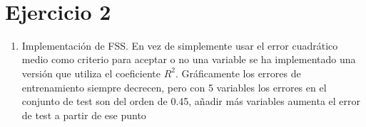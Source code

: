 \documentclass[11pt]{article}
\begin{document}
    \begin{center}
    \end{center}
    { \hspace*{\fill} \\}
    
    \section{Ejercicio 2}\label{ejercicio-2}

    \begin{enumerate}
\def\labelenumi{(\alph{enumi})}
\itemsep1pt\parskip0pt
\item
  Implementación de FSS. En vez de simplemente usar el error cuadrático
  medio como criterio para aceptar o no una variable se ha implementado
  una versión que utiliza el coeficiente \(R^2\). Gráficamente los
  errores de entrenamiento siempre decrecen, pero con 5 variables los
  errores en el conjunto de test son del orden de 0.45, añadir más
  variables aumenta el error de test a partir de ese punto
\end{enumerate}
\end{document}
